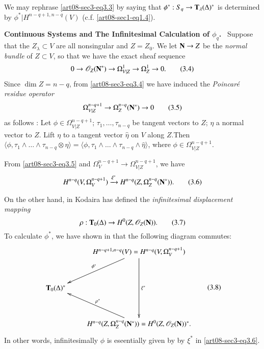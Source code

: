 We may rephrase \eqref{art08-sec3-eq3.3} by saying that $\phi^{*}:S_{q}\to \mathbf{T}_{\lambda}(\Delta)^{*}$ is determined by $\phi^{*}|H^{n-q+1,n-q}(V)$ (c.f. \eqref{art08-sec1-eq1.4}).

\medskip
\noindent
{\bf Continuous Systems and The Infinitesimal Calculation of {\boldmath$\phi_{q}$.}}~ Suppose that the $Z_{\lambda}\subset V$ are all nonsingular and $Z=Z_{0}$. We let $\mathbf{N}\to Z$ be the {\em normal bundle} of $Z\subset V$, so that we have the exact sheaf sequence
\begin{equation*}
0\to \mathscr{O}_{Z}(\mathbf{N}^{*})\to \Omega^{1}_{V|Z}\to \Omega^{1}_{Z}\to 0.\tag{3.4}\label{art08-sec3-eq3.4}
\end{equation*}
Since $\dim Z=n-q$, from \eqref{art08-sec3-eq3.4} we have induced the {\em Poincar\'e residue operator}
\begin{equation*}
\Omega^{n-q+1}_{V|Z}\to \Omega^{n-q}_{Z}(\mathbf{N}^{*})\to 0\tag{3.5}\label{art08-sec3-eq3.5}
\end{equation*}
as follows : Let $\phi\in \Omega^{n-q+1}_{V|Z}$; $\tau_{1},\ldots,\tau_{n-q}$ be tangent vectors to $Z$; $\eta$ a normal vector to $Z$. Lift $\eta$ to a tangent vector $\widehat{\eta}$ on $V$ along $Z$.\pageoriginale Then $\langle \phi, \tau_{1}\wedge\ldots\wedge \tau_{n-q}\otimes \eta\rangle=\langle \phi,\tau_{1}\wedge\ldots\wedge \tau_{n-q}\wedge\widehat{\eta}\rangle$, where $\phi\in \Omega^{n-q+1}_{V|Z}$.

From \eqref{art08-sec3-eq3.5} and $\Omega^{n-q+1}_{V}\to \Omega^{n-q+1}_{V|Z}$, we have
\begin{equation*}
H^{n-q}(V,\Omega^{n-q+1}_{V})\xrightarrow{\xi^{*}}H^{n-q}(Z,\Omega^{n-q}_{Z}(\mathbf{N}^{*})).\tag{3.6}\label{art08-sec3-eq3.6}
\end{equation*}

On the other hand, in \cite{art08-key16} Kodaira has defined the {\em infinitesimal displacement mapping}
\begin{equation*}
\rho : \mathbf{T}_{0}(\Delta)\to H^{0}(Z,\mathscr{O}_{Z}(\mathbf{N})).\tag{3.7}\label{art08-sec3-eq3.7}
\end{equation*}
To calculate $\phi^{*}$, we have shown in \cite{art08-key9} that the following diagram commutes:
\begin{equation*}
\vcenter{\xymatrix@R=1.2cm{
 & H^{n-q+1,n-q}(V)=H^{n-q}(V,\Omega^{n-q+1}_{V})\ar[dd]^-{\xi^{*}}\ar[dl]_-{\phi^{*}}\\
\bfT_{0}(\Delta)^{*} & \\
& H^{n-q}(Z,\Omega^{n-q}_{Z}(\bfN^{*}))=H^{0}(Z,\mathscr{O}_{Z}(\bfN))^{*}.\ar[ul]_-{\rho^{*}}
}}\tag{3.8}\label{art08-sec3-eq3.8}
\end{equation*}
In other words, infinitesimally $\phi$ is eseentially given by by $\xi^{*}$ in \eqref{art08-sec3-eq3.6}.

